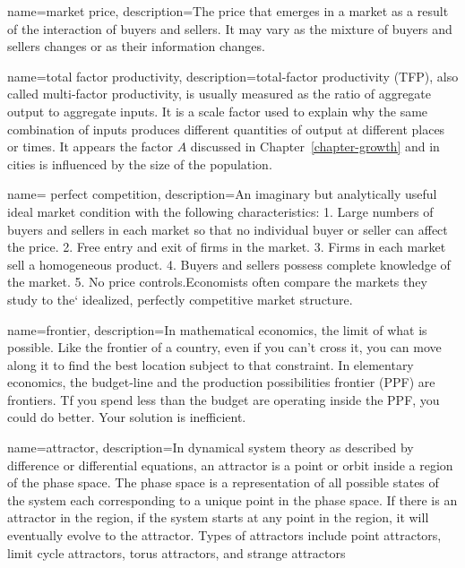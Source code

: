 {
name=market price,
description={The price that emerges in a \gls{market} as a result of the interaction of buyers and sellers. It may vary as the mixture of buyers and sellers changes or as their information changes.}
}




{
name=total factor productivity,
description={total-factor productivity (TFP), also called multi-factor productivity, is usually measured as the ratio of aggregate output  to aggregate inputs. It is a scale factor used to explain why the same combination of inputs produces different quantities of output at different places or times. It appears the factor  $A$ discussed in Chapter~\ref{chapter-growth} and in cities is influenced by the size of the population.  }
}

{
name= perfect competition,
description={An imaginary but analytically useful ideal market condition with the following  characteristics: 1. Large numbers of buyers and sellers in each market so that no individual buyer or seller can affect the price. 2. Free entry and exit of firms in the market. 3. Firms in each market sell a homogeneous product. 4. Buyers and sellers possess complete knowledge of the market. 5. No price controls.\newline  Economists often compare the markets they study to the` idealized, perfectly competitive market structure.}
}

{
name=frontier,
description={In mathematical economics, the limit of what is possible. Like the frontier of a country, even if you can't cross it, you can move along it to find the best location  subject to that constraint. In elementary economics, the budget-line and the production possibilities frontier (PPF) are  frontiers. Tf you spend less than the budget are operating inside the PPF, you could do better. Your solution is inefficient. }
}

{
name=attractor,
description={In \gls{dynamical system} theory as described by difference or differential equations, an attractor is a point or orbit inside a region of the phase space. The phase space is a representation of all possible states of the system each corresponding to a unique point in the phase space. If there is an attractor in the region, if the system starts at any point in the region, it will eventually evolve to the attractor. Types of attractors include point attractors, limit cycle attractors, torus attractors, and strange attractors}
}

